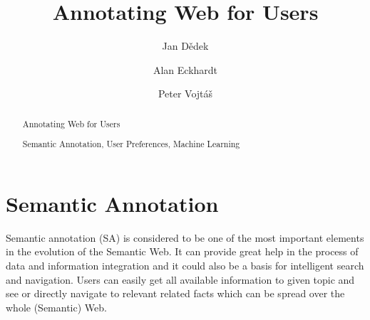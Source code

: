 \documentclass[runningheads,a4paper]{llncs}
\newcommand{\keywords}[1]{\par\addvspace\baselineskip
\noindent\keywordname\enspace\ignorespaces#1}
\begin{document}
\mainmatter  %

\title{Annotating Web for Users}


%
%
\author{Jan D\v{e}dek \and Alan Eckhardt \and Peter Vojt\'{a}\v{s}}
%


%
%

\maketitle


\begin{abstract}
Annotating Web for Users
\keywords{Semantic Annotation, User Preferences, Machine Learning}
\end{abstract}


\section{Semantic Annotation}
Semantic annotation (SA) is considered to be one of the most important elements in the evolution of the Semantic Web. It can provide great help in the process of data and information integration and it could also be a basis for intelligent search and navigation. Users can easily get all available information to given topic and see or directly navigate to relevant related facts which can be spread over the whole (Semantic) Web.
\end{document}
